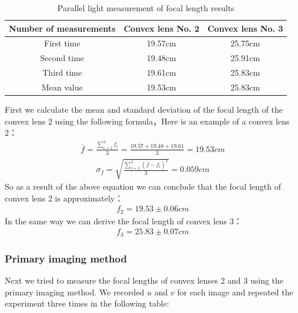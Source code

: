 \documentclass[UTF8]{article}
\begin{document}
    	\begin{table}[H]
    	  \centering
    	  \caption{Parallel light measurement of focal length results}
    	    \begin{tabular}{ccc}
    	    \toprule[2pt]
    	    Number of measurements & Convex lens No. 2 & Convex lens No. 3 \\
    	    \midrule
    	    First time & 19.57cm & 25.75cm \\
    	    Second time & 19.48cm & 25.91cm \\
    	    Third time & 19.61cm & 25.83cm \\
    	    Mean value & 19.53cm & 25.83cm \\
    	    \bottomrule[2pt]
    	    \end{tabular}%
    	  \label{tab:addlabel}%
    	\end{table}%
    
    First we calculate the mean and standard deviation of the focal length of the convex lens 2 using the following formula，Here is an example of a convex lens 2：
    \begin{eqnarray}
    \overline{f}  =  \frac{\sum_{i  =  1}^{3} f_i}{3}  =  \frac{19.57+19.48+19.61}{3}  =  19.53cm
    \end{eqnarray}
    \begin{eqnarray}
    \sigma_f = \sqrt{\frac{ \sum_{i=1}^{3}(\overline{f}-f_i )^2}{3} } = 0.059cm
    \end{eqnarray}
    So as a result of the above equation we can conclude that the focal length of convex lens 2 is approximately：
    \begin{eqnarray}
    f_2 = 19.53 \pm 0.06cm
    \end{eqnarray}
    In the same way we can derive the focal length of convex lens 3：
    \begin{eqnarray}
        f_3 = 25.83 \pm 0.07cm
   \end{eqnarray}
    

    \subsubsection{Primary imaging method}
    Next we tried to measure the focal lengths of convex lenses 2 and 3 using the primary imaging method. We recorded $u$ and $v$ for each image and repeated the experiment three times in the following table:
    
\end{document}
